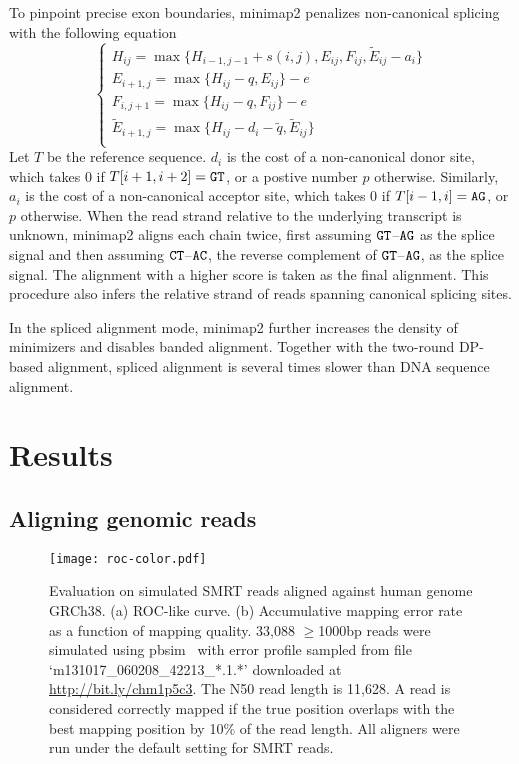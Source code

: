 \documentclass{bioinfo}
\begin{document}
\begin{methods}
To pinpoint precise exon boundaries, minimap2 penalizes non-canonical splicing
with the following equation
\begin{equation}\label{eq:splice}
\left\{\begin{array}{l}
H_{ij} = \max\{H_{i-1,j-1}+s(i,j),E_{ij},F_{ij},\tilde{E}_{ij}-a_i\}\\
E_{i+1,j}= \max\{H_{ij}-q,E_{ij}\}-e\\
F_{i,j+1}= \max\{H_{ij}-q,F_{ij}\}-e\\
\tilde{E}_{i+1,j}= \max\{H_{ij}-d_i-\tilde{q},\tilde{E}_{ij}\}\\
\end{array}\right.
\end{equation}
Let $T$ be the reference sequence. $d_i$ is the cost of a non-canonical donor
site, which takes 0 if $T[i+1,i+2]={\tt GT}$, or a postive number $p$
otherwise. Similarly, $a_i$ is the cost of a non-canonical acceptor site, which
takes 0 if $T[i-1,i]={\tt AG}$, or $p$ otherwise. When the read strand relative
to the underlying transcript is unknown, minimap2 aligns each chain twice, first
assuming ${\tt GT}$--${\tt AG}$ as the splice signal and then assuming ${\tt
CT}$--${\tt AC}$, the reverse complement of ${\tt GT}$--${\tt AG}$, as the
splice signal. The alignment with a higher score is taken as the final
alignment. This procedure also infers the relative strand of reads spanning
canonical splicing sites.

In the spliced alignment mode, minimap2 further increases the density of
minimizers and disables banded alignment. Together with the two-round DP-based
alignment, spliced alignment is several times slower than DNA sequence
alignment.

\end{methods}

\section{Results}

\subsection{Aligning genomic reads}

\begin{figure}[!tb]
\centering
\texttt{[image: roc-color.pdf]}
\caption{Evaluation on simulated SMRT reads aligned against human genome
GRCh38. (a) ROC-like curve. (b) Accumulative mapping error rate as a function
of mapping quality. 33,088 $\ge$1000bp reads were simulated using
pbsim~\citep{Ono:2013aa} with error profile sampled from file
`m131017\_060208\_42213\_*.1.*' downloaded at
\href{http://bit.ly/chm1p5c3}{http://bit.ly/chm1p5c3}. The N50 read length is
11,628. A read is considered correctly mapped if the true position overlaps
with the best mapping position by 10\% of the read length. All aligners were
run under the default setting for SMRT reads.}\label{fig:eval}
\end{figure}
\end{document}
